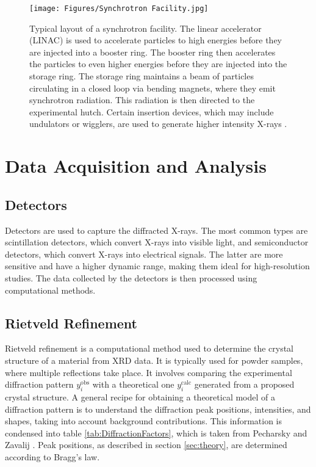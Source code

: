 \documentclass[aps,prb,twocolumn,superscriptaddress]{revtex4-2}
\begin{document}
\begin{figure}[h]
    \centering
    \texttt{[image: Figures/Synchrotron Facility.jpg]}
    \caption{Typical layout of a synchrotron facility. The linear accelerator
    (LINAC) is used to accelerate particles to high energies before they are
    injected into a booster ring. The booster ring then accelerates the
    particles to even higher energies before they are injected into the storage
    ring. The storage ring maintains a beam of particles circulating in a closed
    loop via bending magnets, where they emit synchrotron radiation. This
    radiation is then directed to the experimental hutch. Certain insertion 
    devices, which may include undulators or wigglers, are used to generate
    higher intensity X-rays \cite{Wiedemann2004}.}
    \label{fig:Undulator}
\end{figure}




\section{Data Acquisition and Analysis} \label{sec:data}
\subsection{Detectors}
Detectors are used to capture the diffracted X-rays. The most common types are
scintillation detectors, which convert X-rays into visible light, and
semiconductor detectors, which convert X-rays into electrical signals. The
latter are more sensitive and have a higher dynamic range, making them ideal for
high-resolution studies. The data collected by the detectors is then processed
using computational methods.

\subsection{Rietveld Refinement}
Rietveld refinement is a computational method used to determine the crystal
structure of a material from XRD data. It is typically used for powder samples,
where multiple reflections take place. It involves comparing the experimental
diffraction pattern $y_i^{\text{obs}}$ with a theoretical one $y_i^{\text{calc}}$
generated from a proposed crystal structure. A general recipe for obtaining a 
theoretical model of a diffraction pattern is to understand the diffraction peak 
positions, intensities, and shapes, taking into account background contributions.
This information is condensed into table \ref{tab:DiffractionFactors}, which is taken 
from Pecharsky and Zavalij \cite{pecharsky2005fundamentals}.
Peak positions, as described in section \ref{sec:theory}, are determined according 
to Bragg's law. 
\end{document}
